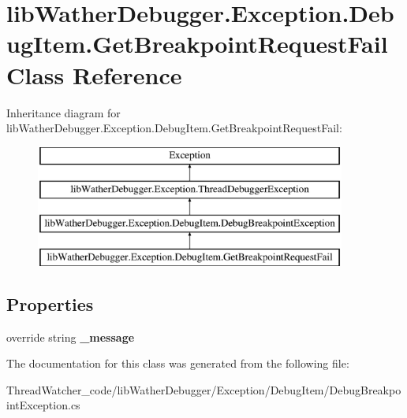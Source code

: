 \hypertarget{classlib_wather_debugger_1_1_exception_1_1_debug_item_1_1_get_breakpoint_request_fail}{\section{lib\+Wather\+Debugger.\+Exception.\+Debug\+Item.\+Get\+Breakpoint\+Request\+Fail Class Reference}
\label{classlib_wather_debugger_1_1_exception_1_1_debug_item_1_1_get_breakpoint_request_fail}
}
Inheritance diagram for lib\+Wather\+Debugger.\+Exception.\+Debug\+Item.\+Get\+Breakpoint\+Request\+Fail\+:\begin{figure}[H]
\begin{center}
\leavevmode
\includegraphics[height=4.000000cm]{classlib_wather_debugger_1_1_exception_1_1_debug_item_1_1_get_breakpoint_request_fail}
\end{center}
\end{figure}
\subsection*{Properties}
\begin{DoxyCompactItemize}
\item 
\hypertarget{classlib_wather_debugger_1_1_exception_1_1_debug_item_1_1_get_breakpoint_request_fail_ad3edce41443a2e5fe7939a05b8e720d6}{override string {\bfseries \+\_\+message}}\label{classlib_wather_debugger_1_1_exception_1_1_debug_item_1_1_get_breakpoint_request_fail_ad3edce41443a2e5fe7939a05b8e720d6}

\end{DoxyCompactItemize}


The documentation for this class was generated from the following file\+:\begin{DoxyCompactItemize}
\item 
Thread\+Watcher\+\_\+code/lib\+Wather\+Debugger/\+Exception/\+Debug\+Item/Debug\+Breakpoint\+Exception.\+cs\end{DoxyCompactItemize}
